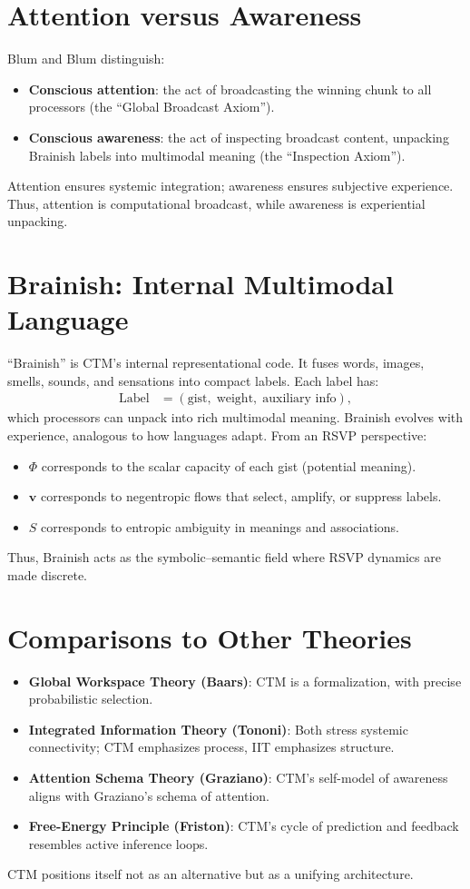\documentclass[a4paper,11pt,openany]{book}
\begin{document}
\section{Attention versus Awareness}
Blum and Blum distinguish:
\begin{itemize}
  \item \textbf{Conscious attention}: the act of broadcasting the winning chunk to all 
  processors (the “Global Broadcast Axiom”).
  \item \textbf{Conscious awareness}: the act of inspecting broadcast content, unpacking 
  Brainish labels into multimodal meaning (the “Inspection Axiom”).
\end{itemize}
Attention ensures systemic integration; awareness ensures subjective experience.  
Thus, attention is computational broadcast, while awareness is experiential unpacking.

\section{Brainish: Internal Multimodal Language}
“Brainish” is CTM’s internal representational code. It fuses words, images, smells, sounds, 
and sensations into compact labels. Each label has:
\begin{align*}
\text{Label} &= (\text{gist}, \;\text{weight}, \;\text{auxiliary info}),
\end{align*}
which processors can unpack into rich multimodal meaning. Brainish evolves with experience, 
analogous to how languages adapt. From an RSVP perspective:
\begin{itemize}
  \item $\Phi$ corresponds to the scalar capacity of each gist (potential meaning).
  \item $\mathbf{v}$ corresponds to negentropic flows that select, amplify, or suppress labels.
  \item $S$ corresponds to entropic ambiguity in meanings and associations.
\end{itemize}
Thus, Brainish acts as the symbolic–semantic field where RSVP dynamics are made discrete.

\section{Comparisons to Other Theories}
\begin{itemize}
  \item \textbf{Global Workspace Theory (Baars)}: CTM is a formalization, with precise 
  probabilistic selection.
  \item \textbf{Integrated Information Theory (Tononi)}: Both stress systemic connectivity; 
  CTM emphasizes process, IIT emphasizes structure.
  \item \textbf{Attention Schema Theory (Graziano)}: CTM’s self-model of awareness aligns 
  with Graziano’s schema of attention.
  \item \textbf{Free-Energy Principle (Friston)}: CTM’s cycle of prediction and feedback 
  resembles active inference loops.
\end{itemize}
CTM positions itself not as an alternative but as a unifying architecture.
\end{document}
